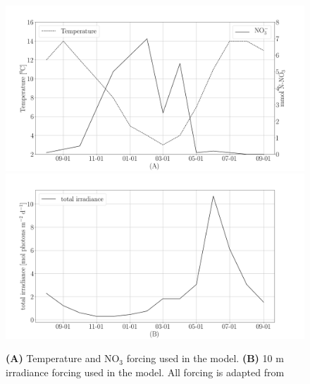 \documentclass{deltares_manual}
\begin{document}
\begin{figure}[H]
	\centering
	\includegraphics[width=1\linewidth]{figures/Temp_NO3}
	\includegraphics[width=1\linewidth]{figures/irradiance}
	\caption[]{\textbf{(A)} Temperature and NO$_{3}$ forcing used in the model. \textbf{(B)} 10 m irradiance forcing used in the model. All forcing is adapted from \cite{broch2012}}
	\label{fig:forcing}
\end{figure}
\end{document}
